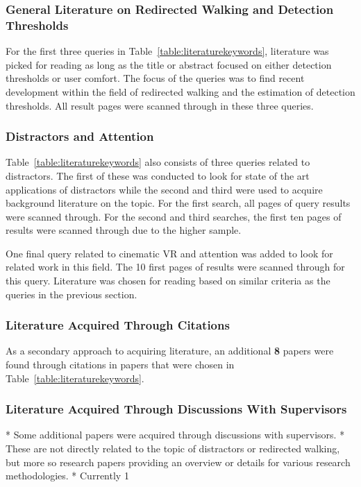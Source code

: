 \subsubsection{General Literature on Redirected Walking and Detection Thresholds}
For the first three queries in Table~\ref{table:literaturekeywords}, literature was picked for reading as long as the title or abstract focused on either detection thresholds or user comfort. The focus of the queries was to find recent development within the field of redirected walking and the estimation of detection thresholds. All result pages were scanned through in these three queries. 

\subsubsection{Distractors and Attention}
Table~\ref{table:literaturekeywords} also consists of three queries related to distractors. The first of these was conducted to look for state of the art applications of distractors while the second and third were used to acquire background literature on the topic. For the first search, all pages of query results were scanned through. For the second and third searches, the first ten pages of results were scanned through due to the higher sample. 

One final query related to cinematic VR and attention was added to look for related work in this field. The 10 first pages of results were scanned through for this query.
Literature was chosen for reading based on similar criteria as the queries in the previous section.

\subsubsection{Literature Acquired Through Citations}
As a secondary approach to acquiring literature, an additional \textbf{8} papers were found through citations in papers that were chosen in Table~\ref{table:literaturekeywords}. 

\subsubsection{Literature Acquired Through Discussions With Supervisors}
* Some additional papers were acquired through discussions with supervisors. 
* These are not directly related to the topic of distractors or redirected walking, but more so research papers providing an overview or details for various research methodologies. 
* Currently 1

